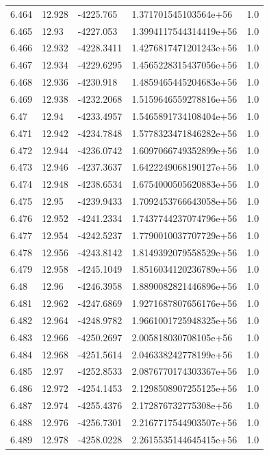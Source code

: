 \begin{tabular}{lllll}
6.464 & 12.928 & -4225.765 & 1.371701545103564e+56 & 1.0 \\
6.465 & 12.93 & -4227.053 & 1.3994117544314419e+56 & 1.0 \\
6.466 & 12.932 & -4228.3411 & 1.4276817471201243e+56 & 1.0 \\
6.467 & 12.934 & -4229.6295 & 1.4565228315437056e+56 & 1.0 \\
6.468 & 12.936 & -4230.918 & 1.4859465445204683e+56 & 1.0 \\
6.469 & 12.938 & -4232.2068 & 1.5159646559278816e+56 & 1.0 \\
6.47 & 12.94 & -4233.4957 & 1.5465891734108404e+56 & 1.0 \\
6.471 & 12.942 & -4234.7848 & 1.5778323471846282e+56 & 1.0 \\
6.472 & 12.944 & -4236.0742 & 1.6097066749352899e+56 & 1.0 \\
6.473 & 12.946 & -4237.3637 & 1.6422249068190127e+56 & 1.0 \\
6.474 & 12.948 & -4238.6534 & 1.6754000505620883e+56 & 1.0 \\
6.475 & 12.95 & -4239.9433 & 1.7092453766643058e+56 & 1.0 \\
6.476 & 12.952 & -4241.2334 & 1.7437744237074796e+56 & 1.0 \\
6.477 & 12.954 & -4242.5237 & 1.7790010037707729e+56 & 1.0 \\
6.478 & 12.956 & -4243.8142 & 1.8149392079558529e+56 & 1.0 \\
6.479 & 12.958 & -4245.1049 & 1.8516034120236789e+56 & 1.0 \\
6.48 & 12.96 & -4246.3958 & 1.8890082821446896e+56 & 1.0 \\
6.481 & 12.962 & -4247.6869 & 1.9271687807656176e+56 & 1.0 \\
6.482 & 12.964 & -4248.9782 & 1.9661001725948325e+56 & 1.0 \\
6.483 & 12.966 & -4250.2697 & 2.005818030708105e+56 & 1.0 \\
6.484 & 12.968 & -4251.5614 & 2.046338242778199e+56 & 1.0 \\
6.485 & 12.97 & -4252.8533 & 2.0876770174303367e+56 & 1.0 \\
6.486 & 12.972 & -4254.1453 & 2.1298508907255125e+56 & 1.0 \\
6.487 & 12.974 & -4255.4376 & 2.172876732775308e+56 & 1.0 \\
6.488 & 12.976 & -4256.7301 & 2.2167717544903507e+56 & 1.0 \\
6.489 & 12.978 & -4258.0228 & 2.2615535144645415e+56 & 1.0 \\

\end{tabular}

